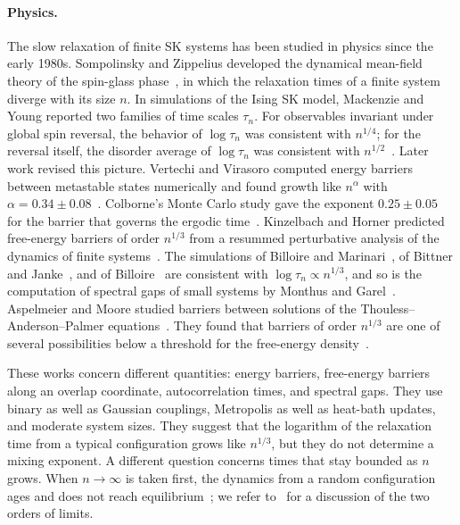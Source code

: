 \paragraph{Physics.}
The slow relaxation of finite SK systems has been studied in physics since
the early 1980s. Sompolinsky and Zippelius developed the dynamical mean-field
theory of the spin-glass
phase~\cite{sompolinsky-zippelius-1981,sompolinsky-zippelius-1982}, in which
the relaxation times of a finite system diverge with its size $n$. In
simulations of the Ising SK model, Mackenzie and Young reported two families of
time scales $\tau_n$. For observables invariant under global spin reversal,
the behavior of $\log\tau_n$ was consistent with $n^{1/4}$; for the reversal
itself, the disorder average of $\log\tau_n$ was consistent with
$n^{1/2}$~\cite{mackenzie-young-1982,mackenzie-young-1983}. Later work
revised this picture. Vertechi and Virasoro computed energy barriers between
metastable states numerically and found growth like $n^\alpha$ with
$\alpha=0.34\pm0.08$~\cite{vertechi-virasoro-1989}. Colborne's Monte Carlo
study gave the exponent $0.25\pm0.05$ for the barrier that governs the
ergodic time~\cite{colborne-1990}. Kinzelbach and Horner predicted
free-energy barriers of order $n^{1/3}$ from a resummed perturbative
analysis of the dynamics of finite systems~\cite{kinzelbach-horner-1991}.
The simulations of Billoire and Marinari~\cite{billoire-marinari-2001}, of
Bittner and Janke~\cite{bittner-janke-2006}, and of
Billoire~\cite{billoire-2010} are consistent with $\log\tau_n\propto n^{1/3}$,
and so is the computation of spectral gaps of small systems by Monthus and
Garel~\cite{monthus-garel-2009}. Aspelmeier and Moore studied barriers
between solutions of the Thouless--Anderson--Palmer
equations~\cite{thouless-anderson-palmer-1977,bray-moore-1981}. They found
that barriers of order $n^{1/3}$ are one of several possibilities below a
threshold for the free-energy density~\cite{aspelmeier-moore-2022}.

These works concern different quantities: energy barriers, free-energy
barriers along an overlap coordinate, autocorrelation times, and spectral
gaps. They use binary as well as Gaussian couplings, Metropolis as well as
heat-bath updates, and moderate system sizes. They suggest that the logarithm
of the relaxation time from a typical configuration grows like $n^{1/3}$,
but they do not determine a mixing exponent. A different question concerns
times that stay bounded as $n$ grows. When $n\to\infty$ is taken first, the
dynamics from a random configuration ages and does not reach
equilibrium~\cite{cugliandolo-kurchan-1994}; we refer
to~\cite[Section~3.7]{bouchaud-cugliandolo-kurchan-mezard-1997} for a
discussion of the two orders of limits.

